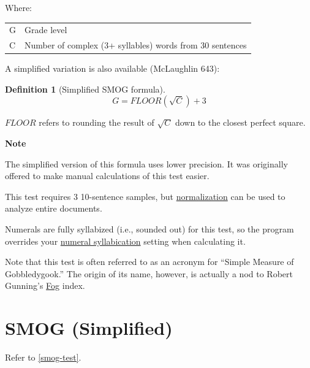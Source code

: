 \documentclass[
]{book}
\newenvironment{notesection}
    {
    \begin{tcolorbox}[colframe=mediumblue,colback=lightblue,coltext=mediumblue,arc=3mm]
    \faLightbulb[regular] \textbf{Note} \newline
    }
    {
    \end{tcolorbox}
    }
\theoremstyle{definition}
\newtheorem{definition}{Definition}[chapter]
\theoremstyle{definition}
\theoremstyle{definition}
\theoremstyle{definition}
\theoremstyle{remark}
\begin{document}
Where:

\begin{longtable}[]{@{}
  >{\raggedright\arraybackslash}p{}
  >{\raggedright\arraybackslash}p{}@{}}
\toprule
\endhead
G & Grade level \\
C & Number of complex (3+ syllables) words from 30 sentences \\
\bottomrule
\end{longtable}

A simplified variation is also available (McLaughlin 643):

\begin{definition}[Simplified SMOG formula]
\protect\hypertarget{def:smogsimple}{}{\label{def:smogsimple} {} }\[
G = FLOOR(\sqrt{C}) + 3
\]
\end{definition}

\(FLOOR\) refers to rounding the result of \(\sqrt{C}\) down to the closest perfect square.

\begin{notesection}
The simplified version of this formula uses lower precision. It was originally offered to make manual calculations of this test easier.

\end{notesection}

This test requires 3 10-sentence samples, but \protect\hyperlink{glossary}{normalization} can be used to analyze entire documents.

Numerals are fully syllabized (i.e., sounded out) for this test, so the program overrides your \protect\hyperlink{numsyllable}{numeral syllabication} setting when calculating it.

Note that this test is often referred to as an acronym for ``Simple Measure of Gobbledygook.'' The origin of its name, however, is actually a nod to Robert Gunning's \protect\hyperlink{gunning-fog-test}{Fog} index.


\hypertarget{smog-test-simplified}{%
\section{\texorpdfstring{SMOG (Simplified)}{SMOG (Simplified)}}\label{smog-test-simplified}}

Refer to \ref{smog-test}.

\newpage
\end{document}
